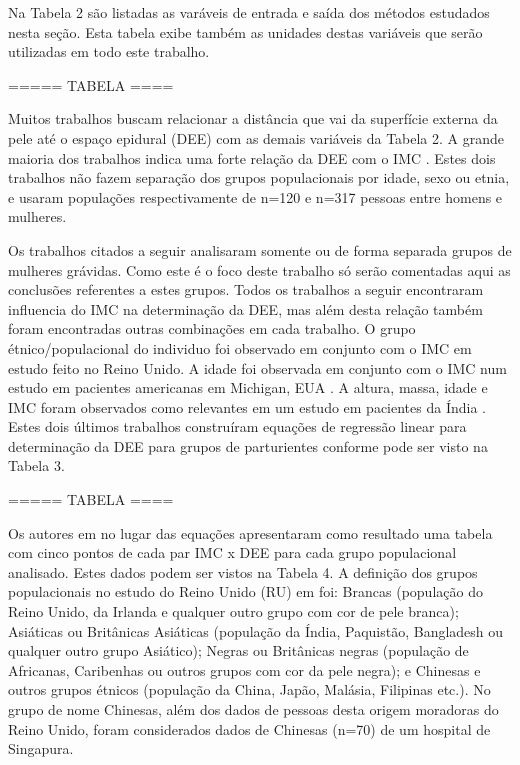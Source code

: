 Na Tabela 2 são listadas as varáveis de entrada e saída dos métodos estudados nesta seção. Esta tabela exibe também as unidades destas variáveis que serão utilizadas em todo este trabalho.

===== TABELA ====

Muitos trabalhos buscam relacionar a distância que vai da superfície externa da pele até o espaço epidural (DEE) com as demais variáveis da Tabela 2. A grande maioria dos trabalhos indica uma forte relação da DEE com o IMC \cite{Adegboye2017, Galbraith2018}. Estes dois trabalhos não fazem separação dos grupos populacionais por idade, sexo ou etnia, e usaram populações respectivamente de n=120 e n=317 pessoas entre homens e mulheres.

Os trabalhos citados a seguir analisaram somente ou de forma separada grupos de mulheres grávidas. Como este é o foco deste trabalho só serão comentadas aqui as conclusões referentes a estes grupos. Todos os trabalhos a seguir encontraram influencia do IMC na determinação da DEE, mas além desta relação também foram encontradas outras combinações em cada trabalho. O grupo étnico/populacional do individuo foi observado em conjunto com o IMC em \cite{Sharma2011} estudo feito no Reino Unido. A idade foi observada em conjunto com o IMC num estudo em pacientes americanas em Michigan, EUA \cite{Clinkscales2007}. A altura, massa, idade e IMC foram observados como relevantes em um estudo em pacientes da Índia \cite{Hazarika2016}. Estes dois últimos trabalhos construíram equações de regressão linear para determinação da DEE para grupos de parturientes conforme pode ser visto na Tabela 3.

===== TABELA ====

Os autores em \cite{Sharma2011} no lugar das equações apresentaram como resultado uma tabela com cinco pontos de cada par IMC x DEE para cada grupo populacional analisado. Estes dados podem ser vistos na Tabela 4. A definição dos grupos populacionais no estudo do Reino Unido (RU) em \cite{Sharma2011} foi: Brancas (população do Reino Unido, da Irlanda e qualquer outro grupo com cor de pele branca); Asiáticas ou Britânicas Asiáticas (população da Índia, Paquistão, Bangladesh ou qualquer outro grupo Asiático); Negras ou Britânicas negras (população de Africanas, Caribenhas ou outros grupos com cor da pele negra); e Chinesas e outros grupos étnicos (população da China, Japão, Malásia, Filipinas etc.). No grupo de nome Chinesas, além dos dados de pessoas desta origem moradoras do Reino Unido, foram considerados dados de Chinesas (n=70) de um hospital de Singapura.


